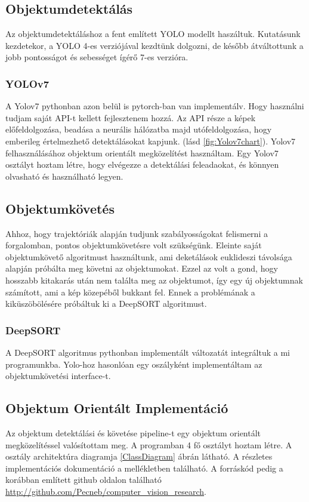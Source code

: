 \documentclass[12pt,a4paper]{article}
\begin{document}
\subsection{Objektumdetektálás}
Az objektumdetektáláshoz a fent említett YOLO modellt haszáltuk. Kutatásunk kezdetekor, a YOLO 4-es verziójával kezdtünk dolgozni,
de később átváltottunk a jobb pontosságot és sebességet ígérő 7-es verzióra.
\subsubsection{YOLOv7}
A Yolov7 pythonban azon belül is pytorch-ban van implementálv. Hogy használni tudjam saját API-t kellett fejlesztenem hozzá.
Az API része a képek előfeldolgozása, beadása a neurális hálózatba majd utófeldolgozása, hogy emberileg értelmezhető detektálásokat
kapjunk. (lásd \ref{fig:Yolov7chart}).
Yolov7 felhasználásához objektum orientált megközelítést használtam. Egy Yolov7 osztályt hoztam létre, hogy elvégezze a detektálási feleadaokat,
és könnyen olvasható és használható legyen.
\subsection{Objektumkövetés}
Ahhoz, hogy trajektóriák alapján tudjunk szabályosságokat felismerni a forgalomban, pontos objektumkövetésre volt szükségünk. Eleinte
saját objektumkövető algoritmust használtunk, ami deketálások euklideszi távolsága alapján próbálta meg követni az objektumokat.
Ezzel az volt a gond, hogy hosszabb kitakarás után nem találta meg az objektumot, így egy új objektumnak számított, ami a kép
közepéből bukkant fel. Ennek a problémának a kiküszöbölésére próbáltuk ki a DeepSORT algoritmust.
\subsubsection{DeepSORT}
A DeepSORT algoritmus pythonban implementált változatát integráltuk a mi programunkba. Yolo-hoz hasonlóan egy oszályként implementáltam az objektumkövetési
interface-t.

\newpage
\subsection{Objektum Orientált Implementáció}
Az objektum detektálási és követése pipeline-t egy objektum orientált megközelítéssel valósítottam meg. A programban 4 fő osztályt hoztam létre. A osztály architektúra diagramja \ref{ClassDiagram} ábrán látható.
A részletes implementációs dokumentáció a mellékletben található. A forráskód pedig a korábban említett github oldalon található \url{http://github.com/Pecneb/computer_vision_research}.
\end{document}
